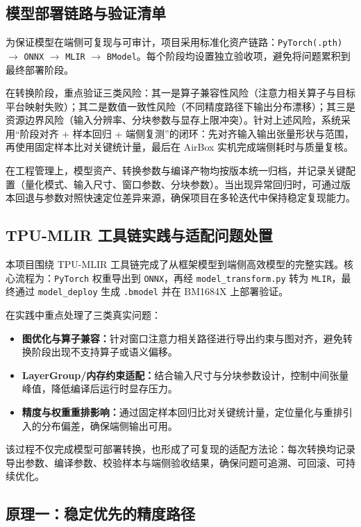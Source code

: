 \documentclass[12pt,a4paper]{ctexart}
\begin{document}
\subsection{模型部署链路与验证清单}

为保证模型在端侧可复现与可审计，项目采用标准化资产链路：\texttt{PyTorch(.pth)} $\rightarrow$ \texttt{ONNX} $\rightarrow$ \texttt{MLIR} $\rightarrow$ \texttt{BModel}。每个阶段均设置独立验收项，避免将问题累积到最终部署阶段。

在转换阶段，重点验证三类风险：其一是算子兼容性风险（注意力相关算子与目标平台映射失败）；其二是数值一致性风险（不同精度路径下输出分布漂移）；其三是资源边界风险（输入分辨率、分块参数与显存上限冲突）。针对上述风险，系统采用“阶段对齐 + 样本回归 + 端侧复测”的闭环：先对齐输入输出张量形状与范围，再使用固定样本比对关键统计量，最后在 AirBox 实机完成端侧耗时与质量复核。

在工程管理上，模型资产、转换参数与编译产物均按版本统一归档，并记录关键配置（量化模式、输入尺寸、窗口参数、分块参数）。当出现异常回归时，可通过版本回退与参数对照快速定位差异来源，确保项目在多轮迭代中保持稳定复现能力。

\subsection{TPU-MLIR 工具链实践与适配问题处置}

本项目围绕 TPU-MLIR 工具链完成了从框架模型到端侧高效模型的完整实践。核心流程为：\texttt{PyTorch} 权重导出到 \texttt{ONNX}，再经 \texttt{model\_transform.py} 转为 \texttt{MLIR}，最终通过 \texttt{model\_deploy} 生成 \texttt{.bmodel} 并在 BM1684X 上部署验证。

在实践中重点处理了三类真实问题：
\begin{itemize}
  \item \textbf{图优化与算子兼容：}针对窗口注意力相关路径进行导出约束与图对齐，避免转换阶段出现不支持算子或语义偏移。
  \item \textbf{LayerGroup/内存约束适配：}结合输入尺寸与分块参数设计，控制中间张量峰值，降低编译后运行时显存压力。
  \item \textbf{精度与权重重排影响：}通过固定样本回归比对关键统计量，定位量化与重排引入的分布偏差，确保端侧输出可用。
\end{itemize}

该过程不仅完成模型可部署转换，也形成了可复现的适配方法论：每次转换均记录导出参数、编译参数、校验样本与端侧验收结果，确保问题可追溯、可回滚、可持续优化。

\subsection{原理一：稳定优先的精度路径}
\end{document}
